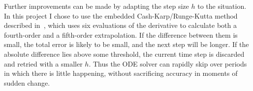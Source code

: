 Further improvements can be made by adapting the step size $h$ to the situation. In this project
I chose to use the embedded Cash-Karp/Runge-Kutta method described in~\cite{NRinC}, which uses
six evaluations of the derivative to calculate both a fourth-order and a fifth-order
extrapolation. If the difference between them is small, the total error is likely to be small,
and the next step will be longer. If the absolute difference lies above some threshold, the current
time step is discarded and retried with a smaller $h$. Thus the ODE solver can rapidly skip over
periods in which there is little happening, without sacrificing accuracy in moments of sudden
change.
